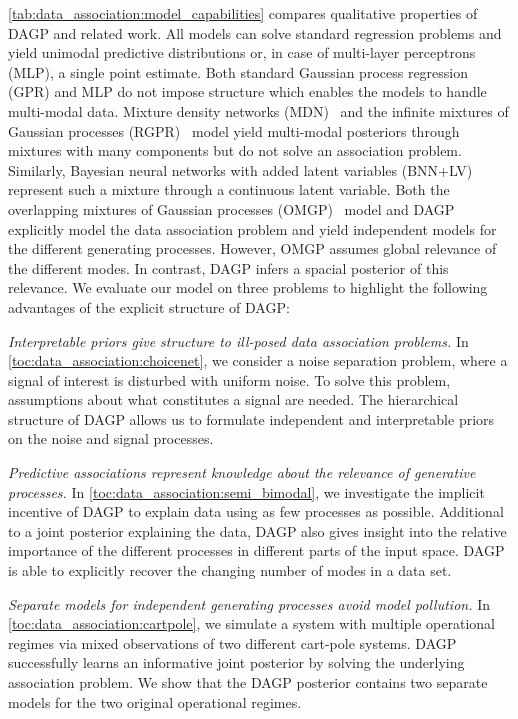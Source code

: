 \cref{tab:data_association:model_capabilities} compares qualitative properties of DAGP and related work.
All models can solve standard regression problems and yield unimodal predictive distributions or, in case of multi-layer perceptrons (MLP), a single point estimate.
Both standard Gaussian process regression (GPR) and MLP do not impose structure which enables the models to handle multi-modal data.
Mixture density networks (MDN)~\parencite{bishop_mixture_1994} and the infinite mixtures of Gaussian processes (RGPR)~\parencite{rasmussen_infinite_2002} model yield multi-modal posteriors through mixtures with many components but do not solve an association problem.
Similarly, Bayesian neural networks with added latent variables (BNN+LV)~\parencite{depeweg_learning_2016} represent such a mixture through a continuous latent variable.
Both the overlapping mixtures of Gaussian processes (OMGP)~\parencite{lazaro-gredilla_overlapping_2012} model and DAGP explicitly model the data association problem and yield independent models for the different generating processes.
However, OMGP assumes global relevance of the different modes.
In contrast, DAGP infers a spacial posterior of this relevance.
We evaluate our model on three problems to highlight the following advantages of the explicit structure of DAGP:

\emph{Interpretable priors give structure to ill-posed data association problems.}
In \cref{toc:data_association:choicenet}, we consider a noise separation problem, where a signal of interest is disturbed with uniform noise.
To solve this problem, assumptions about what constitutes a signal are needed.
The hierarchical structure of DAGP allows us to formulate independent and interpretable priors on the noise and signal processes.

\emph{Predictive associations represent knowledge about the relevance of generative processes.}
In \cref{toc:data_association:semi_bimodal}, we investigate the implicit incentive of DAGP to explain data using as few processes as possible.
Additional to a joint posterior explaining the data, DAGP also gives insight into the relative importance of the different processes in different parts of the input space.
DAGP is able to explicitly recover the changing number of modes in a data set.

\emph{Separate models for independent generating processes avoid model pollution.}
In \cref{toc:data_association:cartpole}, we simulate a system with multiple operational regimes via mixed observations of two different cart-pole systems.
DAGP successfully learns an informative joint posterior by solving the underlying association problem.
We show that the DAGP posterior contains two separate models for the two original operational regimes.


